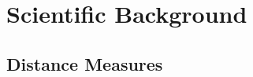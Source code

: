 {%
%


%
\section{Scientific Background}
\label{sec:background_scientific_background}

\subsection{Distance Measures}
}
